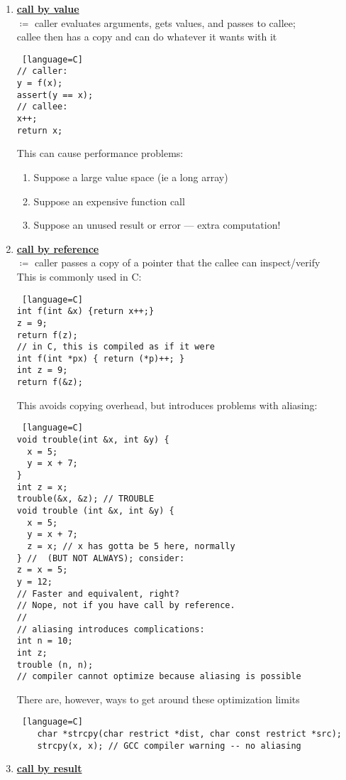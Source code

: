 \documentclass[../../lecture_notes.tex]{subfiles}
\begin{document}
\begin{enumerate} [itemsep=0mm]
	\item \textbf{\underline{call by value}}\\
		$\coloneqq$ caller evaluates arguments, gets values, and passes to callee;\\
				callee then has a copy and can do whatever it wants with it
		\begin{lstlisting} [language=C]
// caller:
y = f(x);
assert(y == x);
// callee:
x++;
return x;
		\end{lstlisting}
 		This can cause performance problems:
		\begin{enumerate} [itemsep=0mm]
			\item Suppose a large value space (ie a long array)
			\item Suppose an expensive function call
			\item Suppose an unused result or error — extra computation!
		\end{enumerate}
	\item \textbf{\underline{call by reference}}\\
		$\coloneqq$ caller passes a copy of a pointer that the callee can inspect/verify\\
		This is commonly used in C:
		\begin{lstlisting} [language=C]
int f(int &x) {return x++;}
z = 9;
return f(z);
// in C, this is compiled as if it were
int f(int *px) { return (*p)++; }
int z = 9;
return f(&z);
		\end{lstlisting}
		This avoids copying overhead, but introduces problems with aliasing:
		\begin{lstlisting} [language=C]
void trouble(int &x, int &y) {
  x = 5;
  y = x + 7;
}
int z = x;
trouble(&x, &z); // TROUBLE
void trouble (int &x, int &y) {
  x = 5;
  y = x + 7;
  z = x; // x has gotta be 5 here, normally
} //  (BUT NOT ALWAYS); consider:
z = x = 5; 
y = 12; 
// Faster and equivalent, right?
// Nope, not if you have call by reference.
//
// aliasing introduces complications:
int n = 10;
int z;
trouble (n, n); 
// compiler cannot optimize because aliasing is possible
	\end{lstlisting}
	There are, however, ways to get around these optimization limits
	\begin{lstlisting} [language=C]
	char *strcpy(char restrict *dist, char const restrict *src);
	strcpy(x, x); // GCC compiler warning -- no aliasing
		\end{lstlisting}
	\item \textbf{\underline{call by result}}\\

\end{enumerate}
\end{document}
